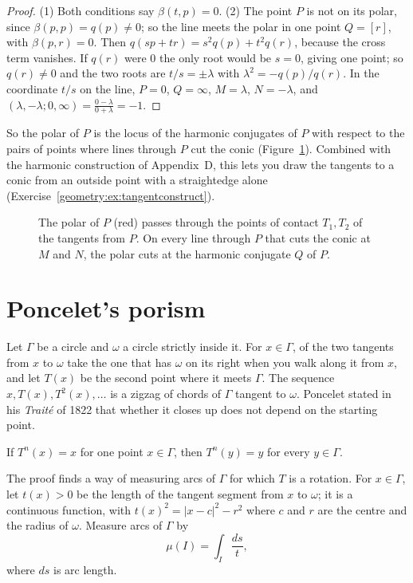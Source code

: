 \begin{proof}
(1) Both conditions say $\beta(t,p)=0$. (2) The point $P$ is not on its polar, since $\beta(p,p)=q(p)\ne0$; so the line meets the polar in one point
$Q=[r]$, with $\beta(p,r)=0$. Then $q(sp+tr)=s^2q(p)+t^2q(r)$, because the cross term vanishes. If $q(r)$ were $0$ the only root would be $s=0$,
giving one point; so $q(r)\ne0$ and the two roots are $t/s=\pm\lambda$ with $\lambda^2=-q(p)/q(r)$. In the coordinate $t/s$ on the line, $P=0$, $Q=\infty$,
$M=\lambda$, $N=-\lambda$, and $(\lambda,-\lambda;0,\infty)=\frac{0-\lambda}{0+\lambda}=-1$.
\end{proof}

So the polar of $P$ is the locus of the harmonic conjugates of $P$ with respect to the pairs of points where lines through $P$ cut the conic
(Figure~\ref{geometry:fig:polar}). Combined with the harmonic construction of Appendix~D, this lets you draw the tangents to a conic from an outside point
with a straightedge alone (Exercise~\ref{geometry:ex:tangentconstruct}).

\begin{figure}[ht]
\centering
{}
\caption{The polar of $P$ (red) passes through the points of contact $T_1,T_2$ of the tangents from $P$. On every line through $P$ that cuts the
conic at $M$ and $N$, the polar cuts at the harmonic conjugate $Q$ of $P$.}
\label{geometry:fig:polar}
\end{figure}

\section{Poncelet's porism}

Let $\Gamma$ be a circle and $\omega$ a circle strictly inside it. For $x\in\Gamma$, of the two tangents from $x$ to $\omega$ take the one that has
$\omega$ on its right when you walk along it from $x$, and let $T(x)$ be the second point where it meets $\Gamma$. The sequence $x,T(x),T^2(x),\dots$
is a zigzag of chords of $\Gamma$ tangent to $\omega$. Poncelet stated in his \emph{Trait\'e} of 1822 that whether it closes up does not depend on the
starting point.

\begin{theorem}\label{geometry:thm:poncelet}
If $T^n(x)=x$ for one point $x\in\Gamma$, then $T^n(y)=y$ for every $y\in\Gamma$.
\end{theorem}

The proof finds a way of measuring arcs of $\Gamma$ for which $T$ is a rotation. For $x\in\Gamma$, let $t(x)>0$ be the length of the tangent segment
from $x$ to $\omega$; it is a continuous function, with $t(x)^2=|x-c|^2-r^2$ where $c$ and $r$ are the centre and the radius of $\omega$. Measure arcs
of $\Gamma$ by
\[
\mu(I)=\int_I\frac{ds}{t},
\]
where $ds$ is arc length.

